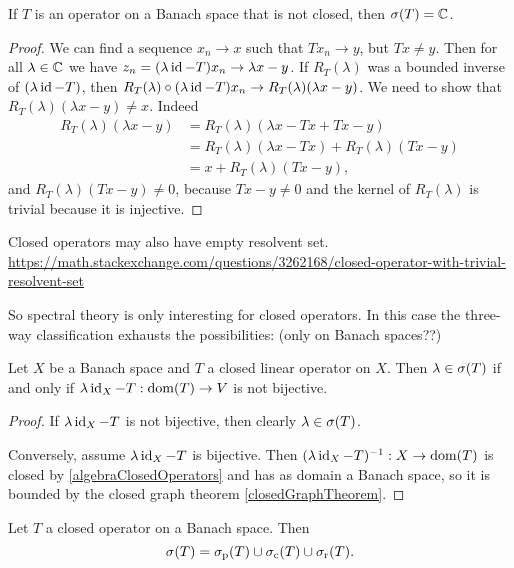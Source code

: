 \begin{proposition} \label{spectrumNonClosedOperator}
If $T$ is an operator on a Banach space that is not closed, then $\sigma(T) = \mathbb{C}$.
\end{proposition}
\begin{proof}
We can find a sequence $x_n \to x$ such that $Tx_n \to y$, but $Tx \neq y$. Then for all $\lambda\in\mathbb{C}$ we have $z_n = (\lambda\operatorname{id} - T)x_n \to \lambda x - y$. If $R_T(\lambda)$ was a bounded inverse of $(\lambda\operatorname{id} - T)$, then $R_T(\lambda)\circ(\lambda\operatorname{id} - T)x_n \to R_T(\lambda)(\lambda x - y)$. We need to show that $R_T(\lambda)(\lambda x - y) \neq x$. Indeed
\begin{align*}
R_T(\lambda)(\lambda x - y) &= R_T(\lambda)(\lambda x - Tx + Tx - y) \\
&= R_T(\lambda)(\lambda x - Tx) + R_T(\lambda)(Tx - y) \\
&= x + R_T(\lambda)(Tx - y),
\end{align*}
and $R_T(\lambda)(Tx - y) \neq 0$, because $Tx - y \neq 0$ and the kernel of $R_T(\lambda)$ is trivial because it is injective. 
\end{proof}

\begin{example}
Closed operators may also have empty resolvent set. \url{https://math.stackexchange.com/questions/3262168/closed-operator-with-trivial-resolvent-set}
\end{example}

So spectral theory is only interesting for closed operators. In this case the three-way classification exhausts the possibilities: (only on Banach spaces??)

\begin{proposition} \label{closedOperatorBanachSpaceSpectrumCriterion}
Let $X$ be a Banach space and $T$ a closed linear operator on $X$. Then $\lambda \in \sigma(T)$ \textup{if and only if} $\lambda \operatorname{id}_X - T: \operatorname{dom}(T) \to V$ is not bijective.
\end{proposition}
\begin{proof}
If $\lambda \operatorname{id}_X - T$ is not bijective, then clearly $\lambda \in \sigma(T)$.

Conversely, assume $\lambda \operatorname{id}_X - T$ is bijective. Then $(\lambda \operatorname{id}_X - T)^{-1}: X\to \operatorname{dom}(T)$ is closed by \ref{algebraClosedOperators} and has as domain a Banach space, so it is bounded by the closed graph theorem \ref{closedGraphTheorem}.
\end{proof}
\begin{corollary}
Let $T$ a closed operator on a Banach space. Then
\[ \sigma(T) = \sigma_\text{p}(T) \cup \sigma_\text{c}(T) \cup \sigma_\text{r}(T). \]
\end{corollary}


